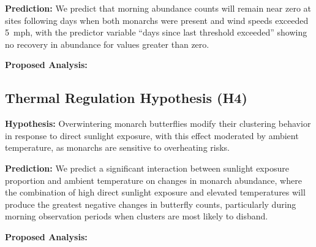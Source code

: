\textbf{Prediction:} We predict that morning abundance counts will remain near zero at sites following days when both monarchs were present and wind speeds exceeded 5~mph, with the predictor variable ``days since last threshold exceeded'' showing no recovery in abundance for values greater than zero.

\textbf{Proposed Analysis:}

\subsection{Thermal Regulation Hypothesis (H4)}

\textbf{Hypothesis:} Overwintering monarch butterflies modify their clustering behavior in response to direct sunlight exposure, with this effect moderated by ambient temperature, as monarchs are sensitive to overheating risks.

\textbf{Prediction:} We predict a significant interaction between sunlight exposure proportion and ambient temperature on changes in monarch abundance, where the combination of high direct sunlight exposure and elevated temperatures will produce the greatest negative changes in butterfly counts, particularly during morning observation periods when clusters are most likely to disband.

\textbf{Proposed Analysis:}
